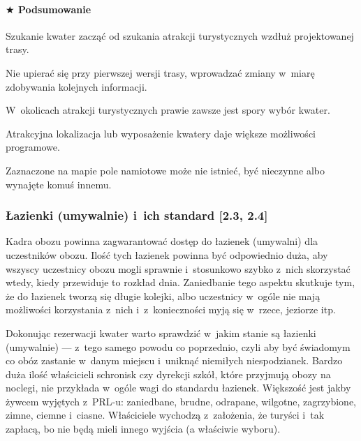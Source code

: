 \documentclass[a5paper,10pt,titlepage,twoside]{article}
\newcommand*{\thecheckbox}{\hss$\Box$} %
\newenvironment*{checklist}
{\list{}{%
\renewcommand*{\makelabel}[1]{\thecheckbox}}}
{\endlist}
\begin{document}
\paragraph{$\bigstar$ Podsumowanie}
\begin{checklist}
\item Szukanie kwater zacząć od szukania atrakcji turystycznych wzdłuż projektowanej trasy.
\item Nie upierać się przy pierwszej wersji trasy, wprowadzać zmiany w~miarę zdobywania kolejnych informacji.
\item W~okolicach atrakcji turystycznych prawie zawsze jest spory wybór kwater.
\item Atrakcyjna lokalizacja lub wyposażenie kwatery daje większe możliwości programowe.
\item Zaznaczone na mapie pole namiotowe może nie istnieć, być nieczynne albo wynajęte komuś innemu.
\end{checklist}

\subsubsection{Łazienki (umywalnie) i~ich standard [2.3, 2.4]}
Kadra obozu powinna zagwarantować dostęp do łazienek (umywalni) dla uczestników obozu. Ilość tych łazienek powinna być odpowiednio duża, aby wszyscy uczestnicy obozu mogli sprawnie i~stosunkowo szybko z~nich skorzystać wtedy, kiedy przewiduje to rozkład dnia. Zaniedbanie tego aspektu skutkuje tym, że do łazienek tworzą się długie kolejki, albo uczestnicy w~ogóle nie mają możliwości korzystania z~nich i~z~konieczności myją się w~rzece, jeziorze itp.

Dokonując rezerwacji kwater warto sprawdzić w~jakim stanie są łazienki (umywalnie) --- z~tego samego powodu co poprzednio, czyli aby być świadomym co obóz zastanie w~danym miejscu i~uniknąć niemiłych niespodzianek. Bardzo duża ilość właścicieli schronisk czy dyrekcji szkół, które przyjmują obozy na noclegi, nie przykłada w~ogóle wagi do standardu łazienek. Większość jest jakby żywcem wyjętych z~PRL-u: zaniedbane, brudne, odrapane, wilgotne, zagrzybione, zimne, ciemne i~ciasne. Właściciele wychodzą z~założenia, że turyści i~tak zapłacą, bo nie będą mieli innego wyjścia (a właściwie wyboru).
\end{document}

